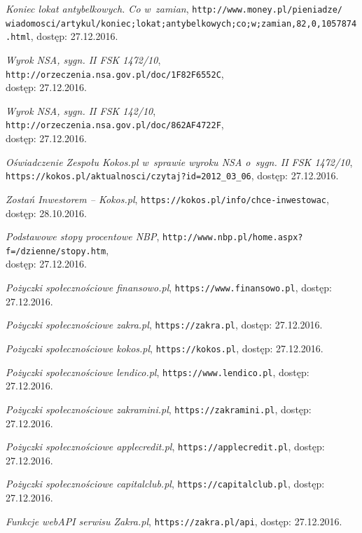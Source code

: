 \documentclass[a4paper,twoside,titlepage,openright]{book}
\begin{document}
\begin{thebibliography}{99}
 \textit{Koniec lokat antybelkowych. Co w~zamian}, 
\texttt{http://www.money.pl/pieniadze/\\wiadomosci/artykul/koniec;lokat;antybelkowych;co;w;zamian,82,0,1057874.html}, dostęp: 27.12.2016.

 \textit{Wyrok NSA, sygn. II FSK 1472/10}, \texttt{http://orzeczenia.nsa.gov.pl/doc/1F82F6552C}, \\dostęp: 27.12.2016.

 \textit{Wyrok NSA, sygn. II FSK 142/10}, 
\texttt{http://orzeczenia.nsa.gov.pl/doc/862AF4722F}, \\dostęp: 27.12.2016.

 \textit{Oświadczenie Zespołu Kokos.pl w~sprawie wyroku NSA o~sygn. II FSK 1472/10}, \\
\texttt{https://kokos.pl/aktualnosci/czytaj?id=2012\_03\_06}, dostęp: 27.12.2016.

 \textit{Zostań Inwestorem -- Kokos.pl}, 
\texttt{https://kokos.pl/info/chce-inwestowac}, \\dostęp: 28.10.2016.

 \textit{Podstawowe stopy procentowe NBP}, 
\texttt{http://www.nbp.pl/home.aspx?f=/dzienne/stopy.htm}, \\dostęp: 27.12.2016.

 \textit{Pożyczki społecznościowe finansowo.pl}, 
\texttt{https://www.finansowo.pl}, dostęp: 27.12.2016.

 \textit{Pożyczki społecznościowe zakra.pl}, 
\texttt{https://zakra.pl}, dostęp: 27.12.2016.

 \textit{Pożyczki społecznościowe kokos.pl}, 
\texttt{https://kokos.pl}, dostęp: 27.12.2016.

 \textit{Pożyczki społecznościowe lendico.pl}, 
\texttt{https://www.lendico.pl}, dostęp: 27.12.2016.

 \textit{Pożyczki społecznościowe zakramini.pl}, 
\texttt{https://zakramini.pl}, dostęp: 27.12.2016.

 \textit{Pożyczki społecznościowe applecredit.pl}, 
\texttt{https://applecredit.pl}, dostęp: 27.12.2016.

 \textit{Pożyczki społecznościowe capitalclub.pl}, 
\texttt{https://capitalclub.pl}, dostęp: 27.12.2016.

 \textit{Funkcje webAPI serwisu Zakra.pl}, 
\texttt{https://zakra.pl/api}, dostęp: 27.12.2016.


\end{thebibliography}
\end{document}
